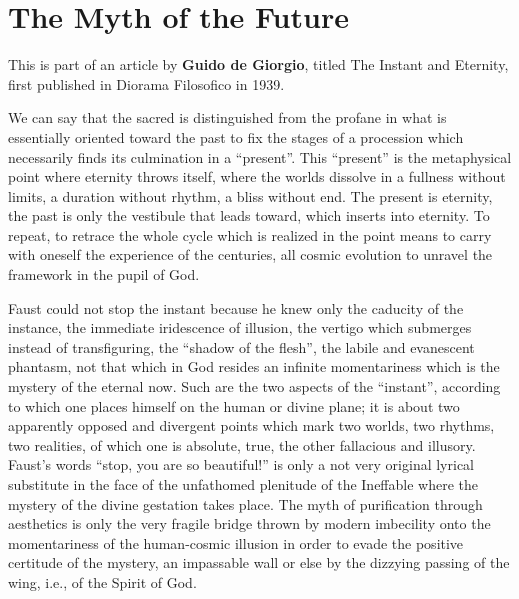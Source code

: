 \section{The Myth of the Future}

\begin{quotex}
This is part of an article by \textbf{Guido de Giorgio}, titled The Instant and Eternity, first published in Diorama Filosofico in 1939.
\end{quotex}


We can say that the sacred is distinguished from the profane in what is essentially oriented toward the past to fix the stages of a procession which necessarily finds its culmination in a ``present''. This ``present'' is the metaphysical point where eternity throws itself, where the worlds dissolve in a fullness without limits, a duration without rhythm, a bliss without end. The present is eternity, the past is only the vestibule that leads toward, which inserts into eternity. To repeat, to retrace the whole cycle which is realized in the point means to carry with oneself the experience of the centuries, all cosmic evolution to unravel the framework in the pupil of God.

Faust could not stop the instant because he knew only the caducity of the instance, the immediate iridescence of illusion, the vertigo which submerges instead of transfiguring, the ``shadow of the flesh'', the labile and evanescent phantasm, not that which in God resides an infinite momentariness which is the mystery of the eternal now. Such are the two aspects of the ``instant'', according to which one places himself on the human or divine plane; it is about two apparently opposed and divergent points which mark two worlds, two rhythms, two realities, of which one is absolute, true, the other fallacious and illusory. Faust's words ``stop, you are so beautiful!'' is only a not very original lyrical substitute in the face of the unfathomed plenitude of the Ineffable where the mystery of the divine gestation takes place. The myth of purification through aesthetics is only the very fragile bridge thrown by modern imbecility onto the momentariness of the human-cosmic illusion in order to evade the positive certitude of the mystery, an impassable wall or else by the dizzying passing of the wing, i.e., of the Spirit of God.

